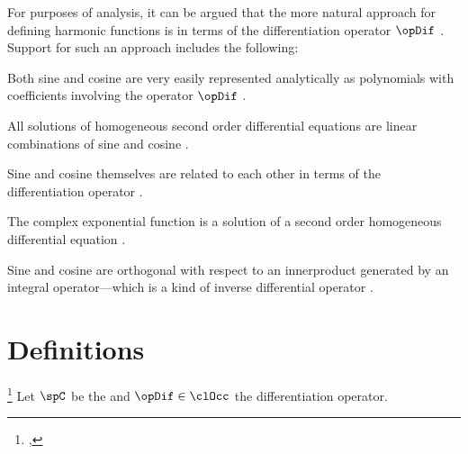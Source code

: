 For purposes of analysis, it can be argued that the more natural approach
for defining harmonic functions is in terms of the
differentiation operator $\opDif$ .
Support for such an approach includes the following:
\begin{liste}
  \item Both sine and cosine are very easily
        represented analytically as polynomials with coefficients involving
        the operator $\opDif$ .
  \item All solutions of homogeneous second order differential equations
        are linear combinations of sine and cosine .
  \item Sine and cosine themselves are related to each other in terms of
        the differentiation operator .
  \item The complex exponential function is a solution of a second order
        homogeneous differential equation .
  \item Sine and cosine are orthogonal with respect to an innerproduct
        generated by an integral operator---which is a kind of inverse
        differential operator .
\end{liste}


\section{Definitions}
\begin{definition}
\footnote{
  ,
  }
\label{def:cos}
Let $\spC$ be the 
and $\opDif\in\clOcc$ the differentiation operator.
\end{definition}

